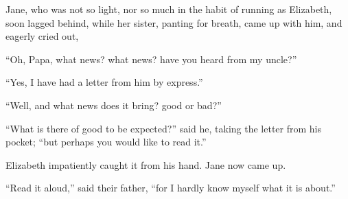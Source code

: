 Jane, who was not so light, nor so much in the habit of
running as Elizabeth, soon lagged behind, while her sister,
panting for breath, came up with him, and eagerly cried out,

“Oh, Papa, what news? what news? have you heard
from my uncle?”

“Yes, I have had a letter from him by express.”

“Well, and what news does it bring? good or bad?”

“What is there of good to be expected?” said he,
taking the letter from his pocket; “but perhaps you
would like to read it.”

Elizabeth impatiently caught it from his hand. Jane
now came up.

“Read it aloud,” said their father, “for I hardly know
myself what it is about.”

